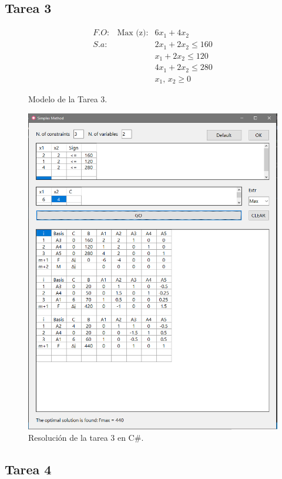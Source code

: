 \documentclass[a4paper, 12pt]{article}
\begin{document}
    \subsection{Tarea 3}
    \begin{figure}[H]
        \[\begin{matrix}
            F\!.\!O:&\text{Max (z)}:&6x_1+4x_2\\
            S.\!a: &&2x_1+2x_2\leq 160\\
            &&x_1+2x_2\leq 120\\
            &&4x_1+2x_2\leq 280\\
            &&x_1,\, x_2\geq 0
        \end{matrix}\]
        \caption{Modelo de la Tarea 3.}
    \end{figure}
    \begin{figure}[H]
        \centering
        \includegraphics[width=12cm]{tarea3.PNG}
        \caption{Resolución de la tarea 3 en C\#.}
    \end{figure}
    \subsection{Tarea 4}
\end{document}
